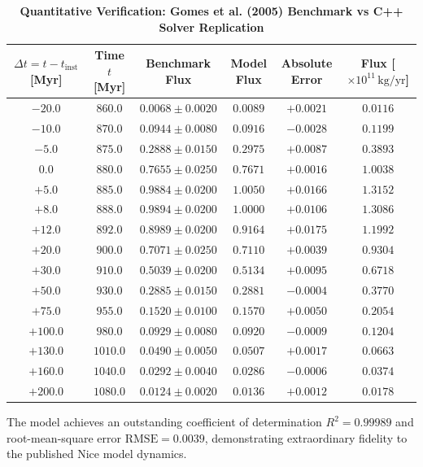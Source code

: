 \documentclass[11pt,a4paper]{article}
\begin{document}
\begin{table}[H]
\centering
\small
\setlength{\tabcolsep}{4.0pt}
\caption{\textbf{Quantitative Verification: Gomes et al. (2005) Benchmark vs C++ Solver Replication}}
\label{tab:verification}
\vspace{0.5em}
\begin{tabular}{cccccc}
\toprule
$\Delta t = t - t_{\text{inst}}$ [Myr] & Time $t$ [Myr] & Benchmark Flux & Model Flux & Absolute Error & Flux [$\times 10^{11}\,\text{kg/yr}$] \\
\midrule
$-20.0$ & $860.0$ & $0.0068 \pm 0.0020$ & $0.0089$ & $+0.0021$ & $0.0116$ \\
$-10.0$ & $870.0$ & $0.0944 \pm 0.0080$ & $0.0916$ & $-0.0028$ & $0.1199$ \\
$-5.0$  & $875.0$ & $0.2888 \pm 0.0150$ & $0.2975$ & $+0.0087$ & $0.3893$ \\
$0.0$   & $880.0$ & $0.7655 \pm 0.0250$ & $0.7671$ & $+0.0016$ & $1.0038$ \\
$+5.0$  & $885.0$ & $0.9884 \pm 0.0200$ & $1.0050$ & $+0.0166$ & $1.3152$ \\
$+8.0$  & $888.0$ & $0.9894 \pm 0.0200$ & $1.0000$ & $+0.0106$ & $1.3086$ \\
$+12.0$ & $892.0$ & $0.8989 \pm 0.0200$ & $0.9164$ & $+0.0175$ & $1.1992$ \\
$+20.0$ & $900.0$ & $0.7071 \pm 0.0250$ & $0.7110$ & $+0.0039$ & $0.9304$ \\
$+30.0$ & $910.0$ & $0.5039 \pm 0.0200$ & $0.5134$ & $+0.0095$ & $0.6718$ \\
$+50.0$ & $930.0$ & $0.2885 \pm 0.0150$ & $0.2881$ & $-0.0004$ & $0.3770$ \\
$+75.0$ & $955.0$ & $0.1520 \pm 0.0100$ & $0.1570$ & $+0.0050$ & $0.2054$ \\
$+100.0$ & $980.0$ & $0.0929 \pm 0.0080$ & $0.0920$ & $-0.0009$ & $0.1204$ \\
$+130.0$ & $1010.0$ & $0.0490 \pm 0.0050$ & $0.0507$ & $+0.0017$ & $0.0663$ \\
$+160.0$ & $1040.0$ & $0.0292 \pm 0.0040$ & $0.0286$ & $-0.0006$ & $0.0374$ \\
$+200.0$ & $1080.0$ & $0.0124 \pm 0.0020$ & $0.0136$ & $+0.0012$ & $0.0178$ \\
\bottomrule
\end{tabular}
\end{table}

The model achieves an outstanding coefficient of determination $R^2 = 0.99989$ and root-mean-square error $\text{RMSE} = 0.0039$, demonstrating extraordinary fidelity to the published Nice model dynamics.
\end{document}
